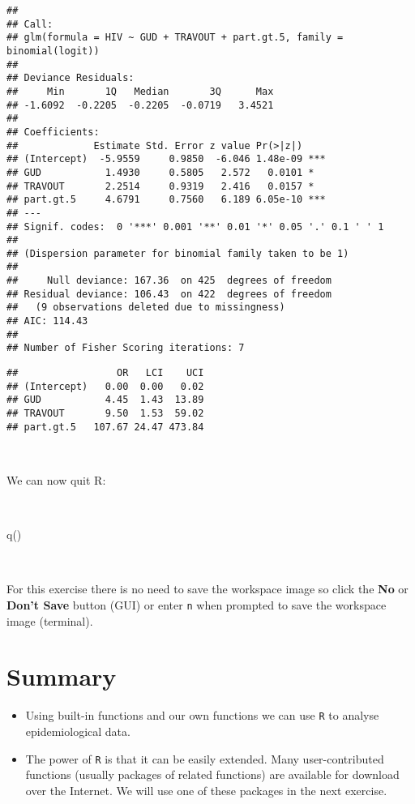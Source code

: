 \documentclass[
  12pt,
  a4paper]{book}
\newenvironment{Shaded}{\begin{snugshade}}{\end{snugshade}}
\newcommand{\FunctionTok}[1]{\textcolor[rgb]{0.00,0.00,0.00}{#1}}
\newcommand{\NormalTok}[1]{#1}
\begin{document}
\begin{verbatim}
## 
## Call:
## glm(formula = HIV ~ GUD + TRAVOUT + part.gt.5, family = binomial(logit))
## 
## Deviance Residuals: 
##     Min       1Q   Median       3Q      Max  
## -1.6092  -0.2205  -0.2205  -0.0719   3.4521  
## 
## Coefficients:
##             Estimate Std. Error z value Pr(>|z|)    
## (Intercept)  -5.9559     0.9850  -6.046 1.48e-09 ***
## GUD           1.4930     0.5805   2.572   0.0101 *  
## TRAVOUT       2.2514     0.9319   2.416   0.0157 *  
## part.gt.5     4.6791     0.7560   6.189 6.05e-10 ***
## ---
## Signif. codes:  0 '***' 0.001 '**' 0.01 '*' 0.05 '.' 0.1 ' ' 1
## 
## (Dispersion parameter for binomial family taken to be 1)
## 
##     Null deviance: 167.36  on 425  degrees of freedom
## Residual deviance: 106.43  on 422  degrees of freedom
##   (9 observations deleted due to missingness)
## AIC: 114.43
## 
## Number of Fisher Scoring iterations: 7
\end{verbatim}

\begin{verbatim}
##                 OR   LCI    UCI
## (Intercept)   0.00  0.00   0.02
## GUD           4.45  1.43  13.89
## TRAVOUT       9.50  1.53  59.02
## part.gt.5   107.67 24.47 473.84
\end{verbatim}

~

We can now quit R:

~

\begin{Shaded}
\begin{Highlighting}[]
\FunctionTok{q}\NormalTok{()}
\end{Highlighting}
\end{Shaded}

~

For this exercise there is no need to save the workspace image so click the \textbf{No} or \textbf{Don't Save} button (GUI) or enter \texttt{n} when prompted to save the workspace image (terminal).

\hypertarget{summary-3}{%
\section{Summary}\label{summary-3}}

\begin{itemize}
\item
  Using built-in functions and our own functions we can use \texttt{R} to analyse epidemiological data.
\item
  The power of \texttt{R} is that it can be easily extended. Many user-contributed functions (usually packages of related functions) are available for download over the Internet. We will use one of these packages in the next exercise.
\end{itemize}
\end{document}
